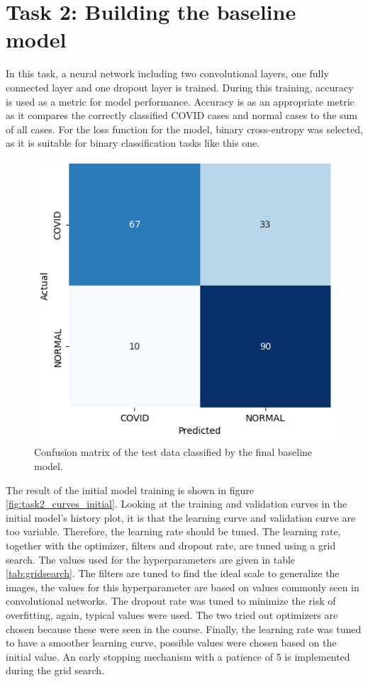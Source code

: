 \documentclass[conference]{IEEEtran}
\begin{document}
\section{Task 2: Building the baseline model}\label{sec:task_2}


In this task, a neural network including two convolutional layers, one fully connected layer and one dropout layer is trained. During this training, accuracy is used as a metric for model performance. Accuracy is as an appropriate metric as it compares the correctly classified COVID cases and normal cases to the sum of all cases.  For the loss function for the model, binary cross-entropy was selected, as it is suitable for binary classification tasks like this one.


\begin{figure}[h!] \centering 						\includegraphics[width=0.9\columnwidth]{fig_task2_confusionmatrix.png} 
	\caption{Confusion matrix of the test data classified by the final baseline model.} 
	\label{fig:task2_confusionmatrix} 
\end{figure}
The result of the initial model training is shown in figure \ref{fig:task2_curves_initial}. Looking at the training and validation curves in the initial model's history plot, it is that the learning curve and validation curve are too variable. Therefore, the learning rate should be tuned. The learning rate, together with the optimizer, filters and dropout rate, are tuned using a grid search. The values used for the hyperparameters are given in table \ref{tab:gridsearch}. The filters are tuned to find the ideal scale to generalize the images, the values for this hyperparameter are based on values commonly seen in convolutional networks. The dropout rate was tuned to minimize the risk of overfitting, again, typical values were used. The two tried out optimizers are chosen because these were seen in the course. Finally, the learning rate was tuned to have a smoother learning curve, possible values were chosen based on the initial value. An early stopping mechanism with a patience of 5 is implemented during the grid search. 
\end{document}

